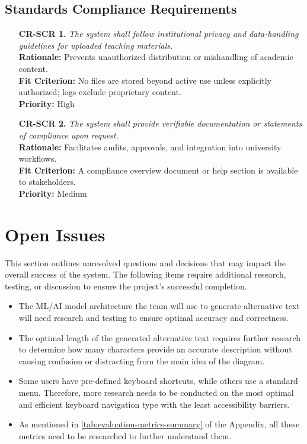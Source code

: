 \documentclass[12pt]{article}
\begin{document}
\subsection{Standards Compliance Requirements}
\begin{itemize}
  \item[\textbf{CR-SCR 1.}] \textit{The system shall follow
      institutional privacy and data-handling guidelines for uploaded
    teaching materials.}\\
    \textbf{Rationale:} Prevents unauthorized distribution or
    mishandling of academic content.\\
    \textbf{Fit Criterion:} No files are stored beyond active use
    unless explicitly authorized; logs exclude proprietary content.\\
    \textbf{Priority:} High

  \item[\textbf{CR-SCR 2.}] \textit{The system shall provide verifiable
    documentation or statements of compliance upon request.}\\
    \textbf{Rationale:} Facilitates audits, approvals, and
    integration into university workflows.\\
    \textbf{Fit Criterion:} A compliance overview document or help
    section is available to stakeholders.\\
    \textbf{Priority:} Medium
\end{itemize}

\section{Open Issues}
This section outlines unresolved questions and decisions that may
impact the overall success of the system.
The following items require additional research, testing, or
discussion to ensure the project’s successful completion.
\begin{itemize}
  \item The ML/AI model architecture the team will use to generate
    alternative text will need research and testing
    to ensure optimal accuracy and correctness.
  \item The optimal length of the generated alternative text requires
    further research to determine how many characters provide an
    accurate description without causing confusion or distracting
    from the main idea of the diagram.
  \item Some users have pre-defined keyboard shortcuts, while others use a standard
  menu. Therefore, more research needs to be conducted on the most optimal and efficient
  keyboard navigation type with the least accessibility barriers. 
  \item As mentioned in \autoref{tab:evaluation-metrics-summary} of the Appendix, all these metrics 
  need to be researched to further understand them. 
\end{itemize}
\end{document}
